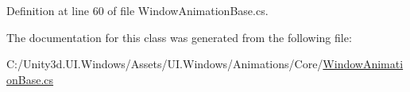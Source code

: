 Definition at line 60 of file Window\+Animation\+Base.\+cs.



The documentation for this class was generated from the following file\+:\begin{DoxyCompactItemize}
\item 
C\+:/\+Unity3d.\+U\+I.\+Windows/\+Assets/\+U\+I.\+Windows/\+Animations/\+Core/\hyperlink{_window_animation_base_8cs}{Window\+Animation\+Base.\+cs}\end{DoxyCompactItemize}
